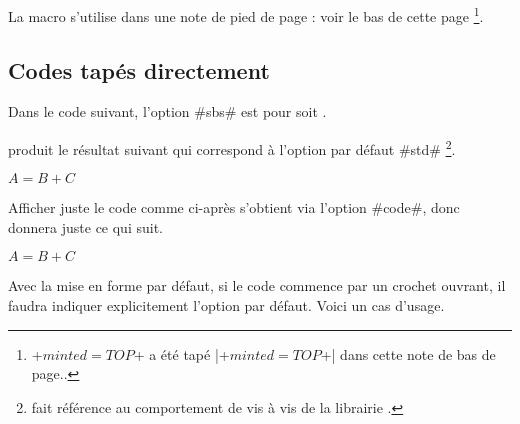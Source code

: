 \begin{bdocimportant}
    La macro  s'utilise dans une note de pied de page : voir le bas de cette page
    \footnote{
        \bdocinlatex+$minted = TOP$+ a été tapé \bdocinlatex|\bdocinlatex+$minted = TOP$+| dans cette note de bas de page..
    }.
\end{bdocimportant}




\subsection{Codes tapés directement}

\begin{bdocexa}
    Dans le code suivant, l'option \bdocinlatex#sbs# est pour  soit .

\end{bdocexa}




\begin{bdocexa}[À la suite]
     produit le résultat suivant qui correspond à l'option par défaut \bdocinlatex#std#
    \footnote{
         fait référence au comportement  de  vis à vis de la librairie .
    }.

    \begin{bdoclatex}
        $A = B + C$
    \end{bdoclatex}
\end{bdocexa}




\begin{bdocexa}
    Afficher juste le code comme ci-après s'obtient via l'option \bdocinlatex#code#, donc  donnera juste ce qui suit.

    \begin{bdoclatex}[code]
        $A = B + C$
    \end{bdoclatex}
\end{bdocexa}




\begin{bdocwarn}
    Avec la mise en forme par défaut, si le code commence par un crochet ouvrant, il faudra indiquer explicitement l'option par défaut. Voici un cas d'usage.

\end{bdocwarn}


